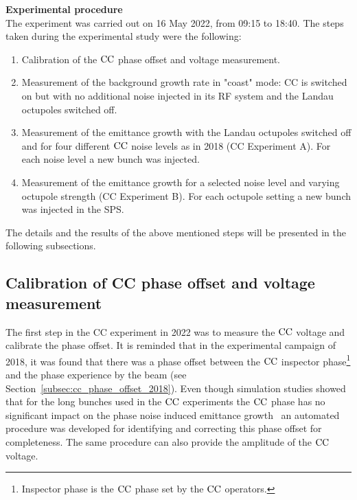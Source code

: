 \textbf{Experimental procedure}\\
The experiment was carried out on 16 May 2022, from 09:15 to 18:40. The steps taken during the experimental study were the following:

\begin{enumerate}
   \item Calibration of the ${\mathrm{CC}}$ phase offset and voltage measurement.
   \item Measurement of the background growth rate in "coast" mode: CC is switched on but with no additional noise injected in its RF system and the Landau octupoles switched off.
   \item Measurement of the emittance growth with the Landau octupoles switched off and for four different ${\mathrm{CC}}$ noise levels as in 2018 (CC Experiment A). For each noise level a new bunch was injected.
   \item Measurement of the emittance growth for a selected noise level and varying octupole strength (CC Experiment B). For each octupole setting a new bunch was injected in the SPS.
\end{enumerate}


The details and the results of the above mentioned steps will be presented in the following subsections.

\subsection{Calibration of CC phase offset and voltage measurement}\label{subsec:cc_calibration_2022}
The first step in the CC experiment in 2022 was to measure the ${\mathrm{CC}}$ voltage and calibrate the phase offset. It is reminded that in the experimental campaign of 2018, it was found that there was a phase offset between the ${\mathrm{CC}}$ inspector phase\footnote{Inspector phase is the ${\mathrm{CC}}$ phase set by the ${\mathrm{CC}}$ operators.} and the phase experience by the beam (see Section~\ref{subsec:cc_phase_offset_2018}). Even though simulation studies showed that for the long bunches used in the ${\mathrm{CC}}$ experiments the ${\mathrm{CC}}$ phase has no significant impact on the phase noise induced emittance growth~\cite{wp4_triantafyllou_2020} an automated procedure was developed for identifying and correcting this phase offset for completeness. The same procedure can also provide the amplitude of the ${\mathrm{CC}}$ voltage.

